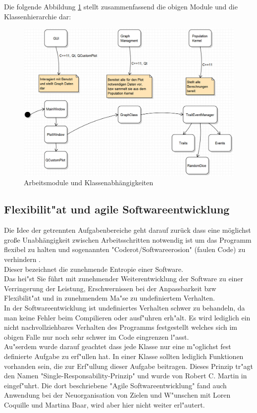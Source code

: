 \documentclass[11pt, a4paper, german]{article}
\theoremstyle{plain}
\begin{document}
 	Die folgende Abbildung \ref{Module und Klassen} stellt zusammenfassend die obigen Module und die Klassenhierarchie dar:
	\begin{figure}[H]
		\centering
		\includegraphics[width=1 \linewidth]{./Pictures/Bild_Module}
		\caption[Module]{Arbeitsmodule und Klassenabhängigkeiten}
		\label{Module und Klassen}
	\end{figure}	
		
	\subsection{Flexibilit"at und agile Softwareentwicklung}
	Die Idee der getrennten Aufgabenbereiche geht darauf zurück dass eine möglichst große Unabhängigkeit zwischen Arbeitsschritten notwendig ist um das Programm flexibel zu halten und sogenannten "{}Coderot/Softwareerosion"{} (faulen Code) zu verhindern \cite{martin2008clean}. \\
	Dieser bezeichnet die zunehmende Entropie einer Software.\\ 
	Das hei"st Sie führt mit zunehmender Weiterentwicklung der Software zu einer Verringerung der Leistung, Erschwernissen bei der Anpassbarkeit bzw Flexibilit"at und in zunehmendem Ma"se zu undefiniertem Verhalten.\\
	In der Softwareentwicklung ist undefiniertes Verhalten schwer zu behandeln, da man keine Fehler beim Compilieren oder ausf"uhren erh"alt. Es wird lediglich ein nicht nachvollziehbares Verhalten des Programms festgestellt welches sich im obigen Falle nur noch sehr schwer im Code eingrenzen l"asst.\\
	
	Au"serdem wurde darauf geachtet dass jede Klasse nur eine m"oglichst fest definierte Aufgabe zu erf"ullen hat. In einer Klasse sollten lediglich Funktionen vorhanden sein, die zur Erf"ullung dieser Aufgabe beitragen. Dieses Prinzip tr"agt den Namen "{}Single-Responsability-Prinzip"{} und wurde von Robert C. Martin in \cite{Martin:2003:ASD:515230} eingef"uhrt. Die dort beschriebene "{}Agile Softwareentwicklung"{} fand auch Anwendung bei der Neuorganisation von Zielen und W"unschen mit Loren Coquille und Martina Baar, wird aber hier nicht weiter erl"autert.
	
\end{document}

